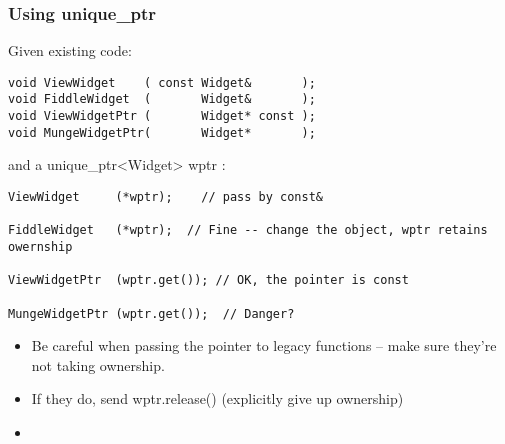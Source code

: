 \begin{frame}[fragile]
\frametitle{Using unique\_ptr}
Given existing code:
{\scriptsize\begin{verbatim}
void ViewWidget    ( const Widget&       );
void FiddleWidget  (       Widget&       );
void ViewWidgetPtr (       Widget* const );
void MungeWidgetPtr(       Widget*       );
\end{verbatim}
}

and a unique\_ptr<Widget> wptr : 

{\scriptsize\begin{verbatim}
ViewWidget     (*wptr);    // pass by const&

FiddleWidget   (*wptr);  // Fine -- change the object, wptr retains owernship

ViewWidgetPtr  (wptr.get()); // OK, the pointer is const

MungeWidgetPtr (wptr.get());  // Danger?
\end{verbatim}}

\begin{itemize}
\item Be careful when passing the pointer to legacy functions -- make sure
they're not taking ownership.
\item If they do, send wptr.release()  (explicitly give up ownership)
\pause{}
\item {}
\end{itemize}

\end{frame}



